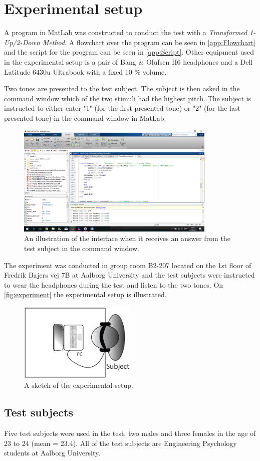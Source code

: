 \section*{Experimental setup}
A program in MatLab was constructed to conduct the test with a \textit{Transformed 1-Up/2-Down Method}. A flowchart over the program can be seen in \autoref{app:Flowchart} and the script for the program can be seen in \autoref{app:Script}. Other equipment used in the experimental setup is a pair of Bang $\&$ Olufsen H6 headphones and a Dell Latitude 6430u Ultrabook with a fixed 10 \% volume.

Two tones are presented to the test subject. The subject is then asked in the command window which of the two stimuli had the highest pitch. The subject is instructed to either enter "1" (for the first presented tone) or "2" (for the last presented tone) in the command window in MatLab.\blankline
%
\begin{figure}[H]
\centering
\includegraphics[width = 0.85\textwidth]{Figure/Interface.png} 
\caption{An illustration of the interface when it receives an answer from the test subject in the command window.}
\label{fig:TestInterface}
\end{figure}
\noindent
% 
The experiment was conducted in group room B2-207 located on the 1st floor of Fredrik Bajers vej 7B at Aalborg University and the test subjects were instructed to wear the headphones during the test and listen to the two tones. On \autoref{fig:experiment} the experimental setup is illustrated. 
%
\begin{figure}[H]
\centering
\includegraphics[width = 0.5\textwidth]{Figure/experiment.png} 
\caption{A sketch of the experimental setup.}
\label{fig:experiment}
\end{figure}
%

\subsection*{Test subjects}
%
Five test subjects were used in the test, two males and three females in the age of 23 to 24 (mean = 23.4). All of the test subjects are Engineering Psychology students at Aalborg University. 
